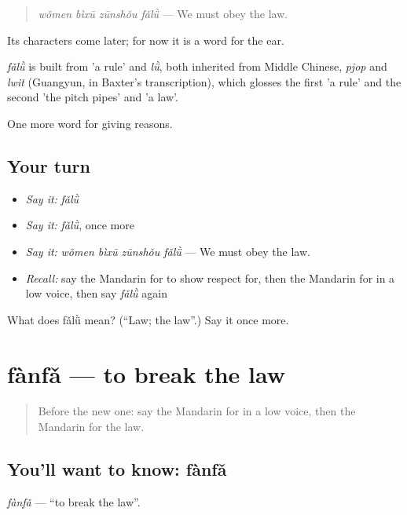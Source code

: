 \begin{quote}
\emph{wǒmen bìxū zūnshǒu fǎlǜ} — We must obey the law.
\end{quote}

Its characters come later; for now it is a word for the ear.

\begin{cousinweb}
\emph{fǎlǜ} is built from  'a rule' and \emph{lǜ}, both inherited from Middle Chinese, \emph{pjop} and \emph{lwit} (Guangyun, in Baxter's transcription), which glosses the first 'a rule' and the second 'the pitch pipes' and 'a law'.
\end{cousinweb}

\begin{grammarlens}[title={What you've built}]
One more word for giving reasons.
\end{grammarlens}

\subsection*{Your turn}
\begin{itemize}
\raggedright
  \item \emph{Say it:} \emph{fǎlǜ}
  \item \emph{Say it:} \emph{fǎlǜ}, once more
  \item \emph{Say it:} \emph{wǒmen bìxū zūnshǒu fǎlǜ} — We must obey the law.
  \item \emph{Recall:} say the Mandarin for to show respect for, then the Mandarin for in a low voice, then say \emph{fǎlǜ} again
\end{itemize}

\begin{tcolorbox}[breakable,colback=teal!4,colframe=teal!35!black,title={Before you move on}]
What does fǎlǜ mean? (\textquotedblleft{}Law; the law\textquotedblright{}.) Say it once more.
\end{tcolorbox}
\section[fànfǎ]{fànfǎ — to break the law}

\label{lesson:ZH-C363-fanfa}



\begin{quote}
Before the new one: say the Mandarin for in a low voice, then the Mandarin for the law.
\end{quote}

\subsection*{You'll want to know: fànfǎ}
\emph{fànfǎ} — \textquotedblleft{}to break the law\textquotedblright{}.

